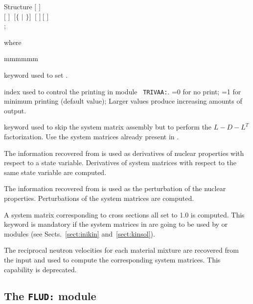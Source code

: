 \begin{DataStructure}{Structure }
$[$   $]$ \\
$[$  $]$ $~[\{$  $|$  $\}]$ $~[$  $]~[$  $]$\\
;
\end{DataStructure}

\noindent where
\begin{ListeDeDescription}{mmmmmm}

\item[\moc{EDIT}] keyword used to set .

\item[\dusa{iprint}] index used to control the printing  in module {\tt
TRIVAA:}. =0 for no print; =1 for minimum printing (default value); Larger
values produce increasing amounts of output.

\item[\moc{SKIP}] keyword used to skip the system matrix assembly but to perform the $L-D-L^T$ factorization. Use the system matrices already present in .

\item[\moc{DERI}] The information recovered from   is used as
derivatives of nuclear properties with respect to a state variable.
Derivatives of system matrices with respect to the same state variable are
computed.

\item[\moc{PERT}] The information recovered from   is used as
the perturbation of the nuclear properties. Perturbations of the system matrices
are computed.

\item[\moc{UNIT}] A system matrix corresponding to cross sections all set to 1.0 is computed. This keyword is mandatory if
the system matrices in  are going to be used by  or  modules (see Sects.~\ref{sect:inikin}
and~\ref{sect:kinsol}).

\item[\moc{OVEL}] The reciprocal neutron velocities for each material mixture are recovered from the input   and used
to compute the corresponding system matrices. This capability is deprecated.

\end{ListeDeDescription}
\clearpage

\subsection{The {\tt FLUD:} module}

